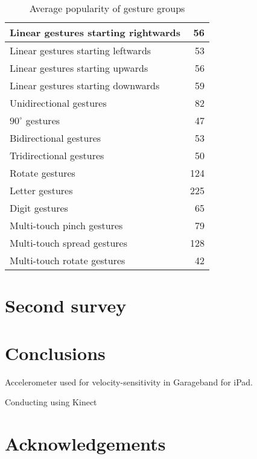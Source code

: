 \documentclass{aes130}
\begin{document}
\begin{table} \label{tab:Survey1AverageGroups}
\begin{center}
\begin{tabular}{|l|r|} \hline

Linear gestures starting rightwards &  56 \\ \hline
Linear gestures starting leftwards  &  53 \\ \hline
Linear gestures starting upwards    &  56 \\ \hline
Linear gestures starting downwards  &  59 \\ \hline \hline

Unidirectional gestures             &  82 \\ \hline
$90^\circ$ gestures                 &  47 \\ \hline
Bidirectional gestures              &  53 \\ \hline
Tridirectional gestures             &  50 \\ \hline \hline

Rotate gestures                     & 124 \\ \hline \hline

Letter gestures                     & 225 \\ \hline
Digit gestures                      &  65 \\ \hline \hline

Multi-touch pinch gestures          &  79 \\ \hline
Multi-touch spread gestures         & 128 \\ \hline
Multi-touch rotate gestures         &  42 \\ \hline

\end{tabular}
\end{center}
\caption{Average popularity of gesture groups}
\end{table}


\section{Second survey} \label{sec:Survey2}





\section{Conclusions} \label{sec:Conclusions}



Accelerometer used for velocity-sensitivity in Garageband for iPad\cite{GaragebandIpadDemo}.

Conducting using Kinect\cite{KinectConductingGameIdea}

\section{Acknowledgements} \label{sec:Acknowledgements}



\end{document}
